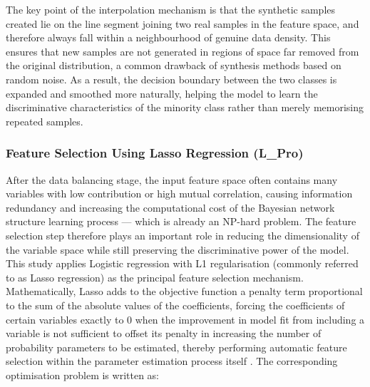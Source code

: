 The key point of the interpolation mechanism is that the synthetic samples created lie on the line segment joining two real samples in the feature space, and therefore always fall within a neighbourhood of genuine data density. This ensures that new samples are not generated in regions of space far removed from the original distribution, a common drawback of synthesis methods based on random noise. As a result, the decision boundary between the two classes is expanded and smoothed more naturally, helping the model to learn the discriminative characteristics of the minority class rather than merely memorising repeated samples.

\subsubsection{Feature Selection Using Lasso Regression (L\_Pro)}
\label{sec: 3.1.2}
\noindent
After the data balancing stage, the input feature space often contains many variables with low contribution or high mutual correlation, causing information redundancy and increasing the computational cost of the Bayesian network structure learning process — which is already an NP-hard problem. The feature selection step therefore plays an important role in reducing the dimensionality of the variable space while still preserving the discriminative power of the model.
This study applies Logistic regression with L1 regularisation (commonly referred to as Lasso regression) as the principal feature selection mechanism. Mathematically, Lasso adds to the objective function a penalty term proportional to the sum of the absolute values of the coefficients, forcing the coefficients of certain variables exactly to $0$ when the improvement in model fit from including a variable is not sufficient to offset its penalty in increasing the number of probability parameters to be estimated, thereby performing automatic feature selection within the parameter estimation process itself \cite{tibshirani1996lasso}. The corresponding optimisation problem is written as:

